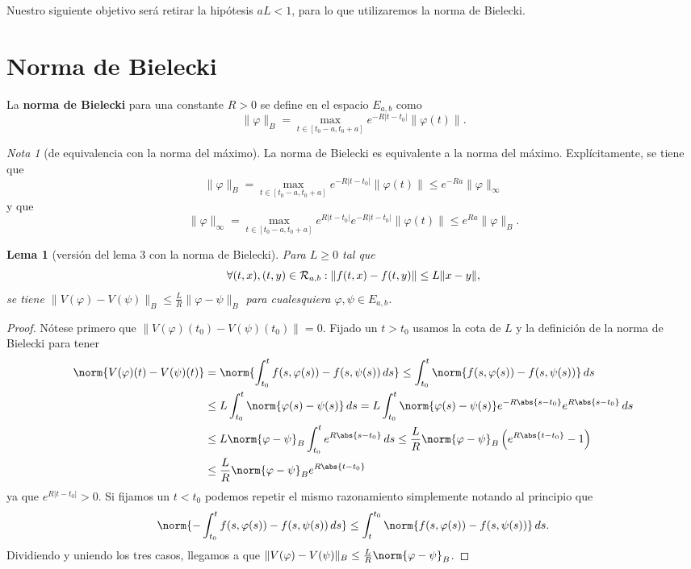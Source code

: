 \documentclass[11pt]{article}
\theoremstyle{plain}
\newtheorem{lemma}{Lema}
\theoremstyle{definition}
\theoremstyle{remark}
\newtheorem{remark}{Nota}
\begin{document}
Nuestro siguiente objetivo será retirar la hipótesis $aL < 1$, para lo que
utilizaremos la norma de Bielecki.

\section{Norma de Bielecki}

La \textbf{norma de Bielecki} para una constante \(R > 0\) se define en el
espacio \(E_{a,b}\) como
\[\|\varphi\|_B = \max_{t \in [t_0-a,t_0+a]} e^{-R|t-t_0|}\|\varphi(t)\|.\]

\begin{remark}[de equivalencia con la norma del máximo]
  La norma de Bielecki es equivalente a la norma del máximo. Explícitamente,
  se tiene que
  \[
    \|\varphi\|_B = \max_{t \in [t_0-a,t_0+a]} e^{-R|t-t_0|} \|\varphi(t)\| \leq
     e^{-Ra} \|\varphi\|_\infty
   \]
   y que
   \[
     \|\varphi\|_\infty =  \max_{t \in [t_0-a,t_0+a]} e^{R|t-t_0|}e^{-R|t-t_0|} \|\varphi(t)\| \leq
     e^{Ra}\|\varphi\|_B.
     \]
\end{remark}

\begin{lemma}[versión del lema 3 con la norma de Bielecki]\label{lema-4-contr}
  Para \(L \geq 0\) tal que
  \[
    \forall (t,x),(t,y) \in {\cal R}_{a,b} : \| f(t,x) - f(t,y) \| \leq L\|x-y\|,
  \]
  se tiene \(\|V(\varphi)-V(\psi)\|_B \leq \frac{L}{R} \|\varphi - \psi\|_B\) para cualesquiera $\varphi,\psi \in E_{a,b}$.
\end{lemma}
\begin{proof}
Nótese primero que $\|V(\varphi)(t_0) - V(\psi)(t_0)\| = 0$. Fijado un $t > t_0$
usamos la cota de $L$ y la definición de la norma de Bielecki para tener
\[\begin{aligned}
\norm{V(\varphi)(t) - V(\psi)(t)} &=
\norm{\int_{t_0}^t f(s,\varphi(s)) - f(s,\psi(s))\,ds} \leq
\int_{t_0}^t \norm{f(s,\varphi(s)) - f(s,\psi(s))}\,ds \\&\leq
L \int_{t_0}^t \norm{\varphi(s) - \psi(s)}\,ds =
L \int_{t_0}^t \norm{\varphi(s) - \psi(s)} e^{-R\abs{s-t_0}}e^{R\abs{s-t_0}}\, ds \\&\leq
L \norm{\varphi - \psi}_{B} \int_{t_0}^t e^{R\abs{s-t_0}}\,ds \leq
\frac{L}{R} \norm{\varphi - \psi}_{B} \left(e^{R\abs{t-t_0}} - 1\right) \\&\leq
\frac{L}{R} \norm{\varphi - \psi}_{B} e^{R\abs{t-t_0}}
\end{aligned}\]
ya que $e^{R|t-t_0|} > 0$. Si fijamos un $t < t_0$ podemos repetir el mismo razonamiento
simplemente notando al principio que
\[
\norm{- \int_{t_0}^t f(s,\varphi(s)) - f(s,\psi(s))\,ds} \leq
\int_{t}^{t_0} \norm{f(s,\varphi(s)) - f(s,\psi(s))}\,ds.
\]
Dividiendo y uniendo los tres casos, llegamos a que
$\|V(\varphi) - V(\psi)\|_{B} \leq \frac{L}{R} \norm{\varphi - \psi}_{B}$.
\end{proof}
\end{document}
